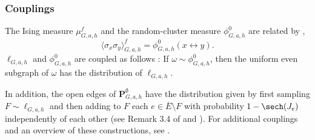 \documentclass[article,12pt,reqno]{amsart}
\begin{document}
\subsubsection*{Couplings}  %
The Ising measure $\mu^f_{G,a,h}$ and the random-cluster measure $\phi^0_{G,a,h}$ are related by \cite{FK72,ES88},
\begin{equation}\label{eq:ES}
	\langle \sigma_x \sigma_y \rangle_{G,a,h}^f=\phi^0_{G,a,h}(x\longleftrightarrow y).
\end{equation}
 $\ell_{G,a,h}$ and $\phi^0_{G,a,h}$ are coupled as follows \cite{EEV02,GJ09}: If $\omega \sim \phi^0_{G,a,h}$, then the uniform even subgraph of $\omega$ has the distribution of $\ell_{G,a,h}$. 
 
In addition, the open edges of $\mathbf{P}_{G,a,h}^{\emptyset}$ have the distribution given by first sampling $F \sim \ell_{G,a,h}$  and then adding to $F$ each $e\in \overline{E}\setminus F$ with probability $1-\sech(J_e)$ independently of each other  (see Remark 3.4 of \cite{DC18} and \cite{LW16}). For additional couplings and an overview of these constructions, see \cite{HJK25}.

\end{document}
